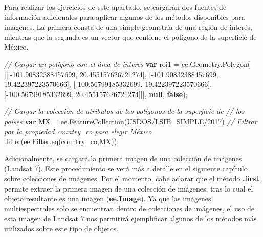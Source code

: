\documentclass[
  12pt,
  letterpaper,
  twoside]{book}
\newenvironment{Shaded}{\begin{snugshade}}{\end{snugshade}}
\newcommand{\AttributeTok}[1]{\textcolor[rgb]{0.48,0.12,0.64}{#1}}
\newcommand{\CommentTok}[1]{\textcolor[rgb]{0.24,0.58,0.00}{\textit{#1}}}
\newcommand{\FloatTok}[1]{\textcolor[rgb]{0.28,0.53,0.93}{#1}}
\newcommand{\FunctionTok}[1]{\textcolor[rgb]{0.48,0.12,0.64}{#1}}
\newcommand{\KeywordTok}[1]{\textcolor[rgb]{0.00,0.00,0.00}{\textbf{#1}}}
\newcommand{\NormalTok}[1]{#1}
\newcommand{\OperatorTok}[1]{\textcolor[rgb]{0.00,0.00,0.00}{#1}}
\newcommand{\StringTok}[1]{\textcolor[rgb]{0.87,0.29,0.22}{#1}}
\newcommand\boldpurple[1]{\textcolor{darkpurple}{\textbf{#1}}}
\begin{document}
Para realizar los ejercicios de este apartado, se cargarán dos fuentes de información adicionales para aplicar algunos de los métodos disponibles para imágenes. La primera consta de una simple geometría de una región de interés, mientras que la segunda es un vector que contiene el polígono de la superficie de México.

\begin{Shaded}
\begin{Highlighting}[]
\CommentTok{// Cargar un polígono con el área de interés}
\KeywordTok{var}\NormalTok{ roi1 }\OperatorTok{=}\NormalTok{ ee}\OperatorTok{.}\AttributeTok{Geometry}\OperatorTok{.}\FunctionTok{Polygon}\NormalTok{(}
\NormalTok{        [[[}\OperatorTok{{-}}\FloatTok{101.90832388457699}\OperatorTok{,} \FloatTok{20.455157626721274}\NormalTok{]}\OperatorTok{,}
\NormalTok{          [}\OperatorTok{{-}}\FloatTok{101.90832388457699}\OperatorTok{,} \FloatTok{19.422397223570666}\NormalTok{]}\OperatorTok{,}
\NormalTok{          [}\OperatorTok{{-}}\FloatTok{100.56799185332699}\OperatorTok{,} \FloatTok{19.422397223570666}\NormalTok{]}\OperatorTok{,}
\NormalTok{          [}\OperatorTok{{-}}\FloatTok{100.56799185332699}\OperatorTok{,} \FloatTok{20.455157626721274}\NormalTok{]]]}\OperatorTok{,} \KeywordTok{null}\OperatorTok{,} \KeywordTok{false}\NormalTok{)}\OperatorTok{;}

\CommentTok{// Cargar la colección de atributos de los polígonos de la superficie de }
\CommentTok{// los países}
\KeywordTok{var}\NormalTok{ MX }\OperatorTok{=}\NormalTok{ ee}\OperatorTok{.}\FunctionTok{FeatureCollection}\NormalTok{(}\StringTok{\textquotesingle{}USDOS/LSIB\_SIMPLE/2017\textquotesingle{}}\NormalTok{)}
  \CommentTok{// Filtrar por la propiedad country\_co para elegir México}
  \OperatorTok{.}\FunctionTok{filter}\NormalTok{(ee}\OperatorTok{.}\AttributeTok{Filter}\OperatorTok{.}\FunctionTok{eq}\NormalTok{(}\StringTok{\textquotesingle{}country\_co\textquotesingle{}}\OperatorTok{,}\StringTok{\textquotesingle{}MX\textquotesingle{}}\NormalTok{))}\OperatorTok{;}
\end{Highlighting}
\end{Shaded}

Adicionalmente, se cargará la primera imagen de una colección de imágenes (Landsat 7). Este procedimiento se verá más a detalle en el siguiente capítulo sobre colecciones de imágenes. Por el momento, cabe aclarar que el método \boldpurple{.first} permite extraer la primera imagen de una colección de imágenes, tras lo cual el objeto resultante es una imagen (\boldpurple{ee.Image}). Ya que las imágenes multiespectrales solo se encuentran dentro de colecciones de imágenes, el uso de esta imagen de Landsat 7 nos permitirá ejemplificar algunos de los métodos más utilizados sobre este tipo de objetos.
\end{document}
